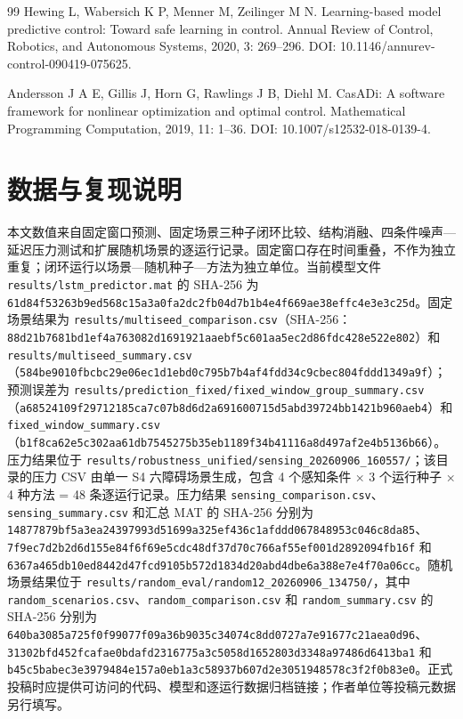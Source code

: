 \documentclass[10pt,a4paper,twocolumn]{ctexart}
\begin{document}
\begin{thebibliography}{99}
 Hewing L, Wabersich K P, Menner M, Zeilinger M N. Learning-based model predictive control: Toward safe learning in control. Annual Review of Control, Robotics, and Autonomous Systems, 2020, 3: 269–296. DOI: 10.1146/annurev-control-090419-075625.

 Andersson J A E, Gillis J, Horn G, Rawlings J B, Diehl M. CasADi: A software framework for nonlinear optimization and optimal control. Mathematical Programming Computation, 2019, 11: 1–36. DOI: 10.1007/s12532-018-0139-4.

\end{thebibliography}

\section{数据与复现说明}

本文数值来自固定窗口预测、固定场景三种子闭环比较、结构消融、四条件噪声—延迟压力测试和扩展随机场景的逐运行记录。固定窗口存在时间重叠，不作为独立重复；闭环运行以场景—随机种子—方法为独立单位。当前模型文件 \texttt{results/lstm\_predictor.mat} 的 SHA-256 为 \texttt{61d84f53263b9ed568c15a3a0fa2dc2fb04d7b1b4e4f669ae38effc4e3e3c25d}。固定场景结果为 \texttt{results/multiseed\_comparison.csv}（SHA-256：\texttt{88d21b7681bd1ef4a763082d1691921aaebf5c601aa5ec2d86fdc428e522e802}）和 \texttt{results/multiseed\_summary.csv}（\texttt{584be9010fbcbc29e06ec1d1ebd0c795b7b4af4fdd34c9cbec804fddd1349a9f}）；预测误差为 \texttt{results/prediction\_fixed/fixed\_window\_group\_summary.csv}（\texttt{a68524109f29712185ca7c07b8d6d2a691600715d5abd39724bb1421b960aeb4}）和 \texttt{fixed\_window\_summary.csv}（\texttt{b1f8ca62e5c302aa61db7545275b35eb1189f34b41116a8d497af2e4b5136b66}）。压力结果位于 \texttt{results/robustness\_unified/sensing\_20260906\_160557/}；该目录的压力 CSV 由单一 S4 六障碍场景生成，包含 4 个感知条件 × 3 个运行种子 × 4 种方法 = 48 条逐运行记录。压力结果 \texttt{sensing\_comparison.csv}、\texttt{sensing\_summary.csv} 和汇总 MAT 的 SHA-256 分别为 \texttt{14877879bf5a3ea24397993d51699a325ef436c1afddd067848953c046c8da85}、\texttt{7f9ec7d2b2d6d155e84f6f69e5cdc48df37d70c766af55ef001d2892094fb16f} 和 \texttt{6367a465db10ed8442d47fcd9105b572d1834d20abd4dbe6a388e7e4f70a06cc}。随机场景结果位于 \texttt{results/random\_eval/random12\_20260906\_134750/}，其中 \texttt{random\_scenarios.csv}、\texttt{random\_comparison.csv} 和 \texttt{random\_summary.csv} 的 SHA-256 分别为 \texttt{640ba3085a725f0f99077f09a36b9035c34074c8dd0727a7e91677c21aea0d96}、\texttt{31302bfd452fcafae0bdafd2316775a3c5058d1652803d3348a97486d6413ba1} 和 \texttt{b45c5babec3e3979484e157a0eb1a3c58937b607d2e3051948578c3f2f0b83e0}。正式投稿时应提供可访问的代码、模型和逐运行数据归档链接；作者单位等投稿元数据另行填写。
\end{document}
